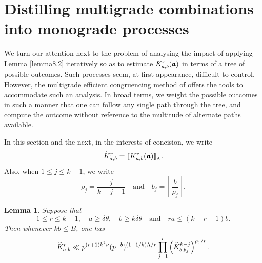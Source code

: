\documentclass[12pt,reqno]{amsart}
\newtheorem{lemma}[theorem]{Lemma}
\theoremstyle{definition}
\theoremstyle{remark}
\numberwithin{equation}{section}
\def\del{{\delta}} \def\Del{{\Delta}} \def\Deltil{{\widetilde \Delta}}
\def\tet{{\theta}} \def\bftet{{\boldsymbol \theta}}
\def\le{\leqslant} \def\ge{\geqslant} \def\pleq{\preccurlyeq} \def\ple{\prec}
\newcommand{\rrbracketsub}[1]{\rrbracket_{\textstyle{_#1}}}
\begin{document}
\section{Distilling multigrade combinations into monograde processes} We turn our 
attention next to the problem of analysing the impact of applying Lemma \ref{lemma8.2} 
iteratively so as to estimate $K_{a,b}^r({\boldsymbol {{\mathfrak a}}})$ in terms of a tree of possible outcomes. 
Such processes seem, at first appearance, difficult to control. However, the multigrade 
efficient congruencing method of \cite{Woo2015, Woo2016, Woo2017} offers the tools to 
accommodate such an analysis. In broad terms, we weight the possible outcomes in such a 
manner that one can follow any single path through the tree, and compute the outcome 
without reference to the multitude of alternate paths available.\par

In this section and the next, in the interests of concision, we write
$$\Ktil_{a,b}^r=\llbracket K_{a,b}^r(\bfgra)\rrbracketsub{\Lam}.$$
Also, when $1\le j\le k-1$, we write
$$\rho_j=\frac{j}{k-j+1}\quad \text{and}\quad b_j=\left\lceil \frac{b}{\rho_j}\right\rceil .$$

\begin{lemma}\label{lemma9.1} Suppose that
\begin{equation}\label{9.1}
1\le r\le k-1,\quad a\ge \del \tet,\quad b\ge k\del \tet\quad \text{and}\quad ra\le (k-r+1)b.
\end{equation}
Then whenever $kb\le B$, one has
\begin{equation}\label{9.2}
\widetilde K_{a,b}^r\ll p^{(r+1)k^2\nu}(p^{-b})^{(1-1/k){\Lambda}/r}
\prod_{j=1}^r\left( \widetilde K_{b,b_j}^{k-j}\right)^{\rho_j/r}.
\end{equation}
\end{lemma}
\end{document}
